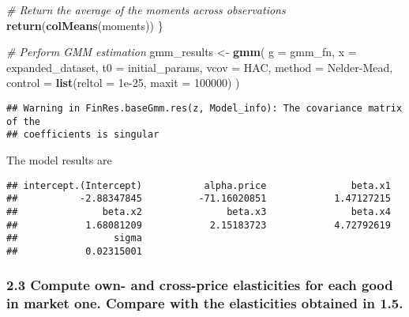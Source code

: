 \documentclass[
]{article}
\newenvironment{Shaded}{\begin{snugshade}}{\end{snugshade}}
\newcommand{\AttributeTok}[1]{\textcolor[rgb]{0.13,0.29,0.53}{#1}}
\newcommand{\CommentTok}[1]{\textcolor[rgb]{0.56,0.35,0.01}{\textit{#1}}}
\newcommand{\DecValTok}[1]{\textcolor[rgb]{0.00,0.00,0.81}{#1}}
\newcommand{\FloatTok}[1]{\textcolor[rgb]{0.00,0.00,0.81}{#1}}
\newcommand{\FunctionTok}[1]{\textcolor[rgb]{0.13,0.29,0.53}{\textbf{#1}}}
\newcommand{\NormalTok}[1]{#1}
\newcommand{\OtherTok}[1]{\textcolor[rgb]{0.56,0.35,0.01}{#1}}
\newcommand{\StringTok}[1]{\textcolor[rgb]{0.31,0.60,0.02}{#1}}
\begin{document}
\begin{Shaded}
\begin{Highlighting}[]
  \CommentTok{\# Return the average of the moments across observations}
  \FunctionTok{return}\NormalTok{(}\FunctionTok{colMeans}\NormalTok{(moments))}
\NormalTok{\}}

\CommentTok{\# Perform GMM estimation}
\NormalTok{gmm\_results }\OtherTok{\textless{}{-}} \FunctionTok{gmm}\NormalTok{(}
  \AttributeTok{g =}\NormalTok{ gmm\_fn,}
  \AttributeTok{x =}\NormalTok{ expanded\_dataset,}
  \AttributeTok{t0 =}\NormalTok{ initial\_params,}
  \AttributeTok{vcov =} \StringTok{\textquotesingle{}HAC\textquotesingle{}}\NormalTok{,}
  \AttributeTok{method =} \StringTok{\textquotesingle{}Nelder{-}Mead\textquotesingle{}}\NormalTok{,}
  \AttributeTok{control =} \FunctionTok{list}\NormalTok{(}\AttributeTok{reltol =} \FloatTok{1e{-}25}\NormalTok{, }\AttributeTok{maxit =} \DecValTok{100000}\NormalTok{)}
\NormalTok{)}
\end{Highlighting}
\end{Shaded}

\begin{verbatim}
## Warning in FinRes.baseGmm.res(z, Model_info): The covariance matrix of the
## coefficients is singular
\end{verbatim}

The model results are

\begin{verbatim}
## intercept.(Intercept)           alpha.price               beta.x1 
##           -2.88347845          -71.16020851            1.47127215 
##               beta.x2               beta.x3               beta.x4 
##            1.68081209            2.15183723            4.72792619 
##                 sigma 
##            0.02315001
\end{verbatim}

\subsubsection{2.3 Compute own- and cross-price elasticities for each
good in market one. Compare with the elasticities obtained in
1.5.}\label{compute-own--and-cross-price-elasticities-for-each-good-in-market-one.-compare-with-the-elasticities-obtained-in-1.5.}
\end{document}
